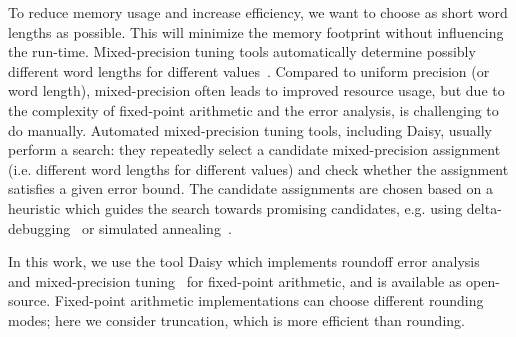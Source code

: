 To reduce memory usage and increase efficiency, we want to choose as short word
lengths as possible. This will minimize the memory footprint without influencing the run-time. Mixed-precision tuning tools automatically determine possibly different
word lengths for different values~\cite{DaisyTuning,Lee2006}. Compared to uniform precision (or word length),
mixed-precision often leads to improved resource usage, but due to the complexity of
fixed-point arithmetic and the error analysis, is challenging to do manually.  
Automated mixed-precision tuning tools, including Daisy, usually perform a search: they repeatedly
select a candidate mixed-precision assignment (i.e. different word lengths for
different values) and check whether the assignment satisfies a given error
bound. The candidate assignments are chosen based on a heuristic which guides
the search towards promising candidates, e.g. using delta-debugging~\cite{DaisyTuning} or
simulated annealing~\cite{Lee2006}.

In this work, we use the tool Daisy which implements roundoff error
analysis~\cite{Daisy} and mixed-precision tuning~\cite{DaisyTuning} for fixed-point arithmetic, and is
available as open-source. Fixed-point arithmetic implementations can choose different
rounding modes; here we consider truncation, which is more efficient than
rounding.